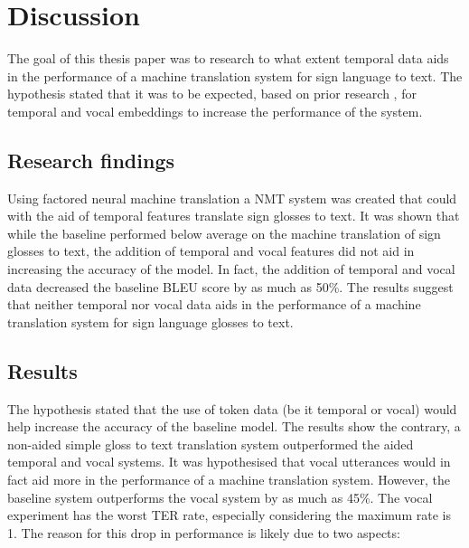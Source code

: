 \break
\section{Discussion}

The goal of this thesis paper was to research to what extent temporal data aids in the performance of a machine translation system for sign language to text. The hypothesis stated that it was to be expected, based on prior research \cite{konradoffentliches}, for temporal and vocal embeddings to increase the performance of the system.

\subsection{Research findings}

Using factored neural machine translation a NMT system was created that could with the aid of temporal features translate sign glosses to text. It was shown that while the baseline performed below average \cite{vaswani2017attention} on the machine translation of sign glosses to text, the addition of temporal and vocal features did not aid in increasing the accuracy of the model. In fact, the addition of temporal and vocal data decreased the baseline BLEU score by as much as 50\%. The results suggest that neither temporal nor vocal data aids in the performance of a machine translation system for sign language glosses to text.

\subsection{Results}

The hypothesis stated that the use of token data (be it temporal or vocal) would help increase the accuracy of the baseline model. The results show the contrary, a non-aided simple gloss to text translation system outperformed the aided temporal and vocal systems. It was hypothesised that vocal utterances would in fact aid more in the performance of a machine translation system. However, the baseline system outperforms the vocal system by as much as 45\%. The vocal experiment has the worst TER rate, especially considering the maximum rate is 1. The reason for this drop in performance is likely due to two aspects: 

